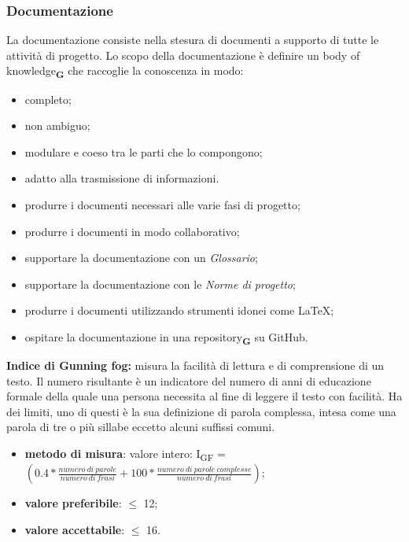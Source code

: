 \subsubsection{Documentazione}
La documentazione consiste nella stesura di documenti a supporto di tutte le attività di progetto.
Lo scopo della documentazione è definire un body of knowledge\textsubscript{\textbf{G}} che raccoglie la conoscenza in modo:
\begin{itemize}
    \item completo;
    \item non ambiguo;
    \item modulare e coeso tra le parti che lo compongono;
    \item adatto alla trasmissione di informazioni.
\end{itemize}
\begin{itemize}
    \item produrre i documenti necessari alle varie fasi di progetto;
    \item produrre i documenti in modo collaborativo;
    \item supportare la documentazione con un \textit{Glossario};
    \item supportare la documentazione con le \textit{Norme di progetto};
    \item produrre i documenti utilizzando strumenti idonei come LaTeX;
    \item ospitare la documentazione in una repository\textsubscript{\textbf{G}} su GitHub.
\end{itemize}
\textbf{Indice di Gunning fog:} misura la facilità di lettura e di comprensione di un testo. Il numero risultante è un indicatore del numero di anni 
di educazione formale della quale una persona necessita al fine di leggere il testo con facilità.
Ha dei limiti, uno di questi è la sua definizione di parola complessa, intesa come una parola di
tre o più sillabe eccetto alcuni suffissi comuni.
\begin{itemize}
    \item \textbf{metodo di misura}: valore intero: I\textsubscript{GF} = $(0.4 *\frac{numero \ di \ parole}{numero \ di \ frasi} + 100 * \frac{numero \ di \ parole \ complesse}{numero \ di \ frasi})$;
    \item \textbf{valore preferibile}: $\leq$ 12;
    \item \textbf{valore accettabile}: $\leq$ 16.
\end{itemize}
